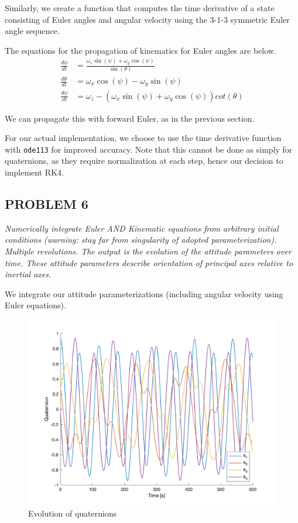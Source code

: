 Similarly, we create a function that computes the time derivative of a state consisting of Euler angles and angular velocity using the 3-1-3 symmetric Euler angle sequence.

The equations for the propagation of kinematics for Euler angles are below.
\begin{align*}
\frac{d \phi}{dt} &= \frac{\omega_{x} \sin(\psi) + \omega_{y} \cos(\psi)}{\sin(\theta)}\\
\frac{d \theta}{dt} &= \omega_{x} \cos(\psi) - \omega_{y} \sin(\psi)\\
\frac{d \psi}{dt} &= \omega_{z} - (\omega_{x} \sin(\psi) + \omega_{y} \cos(\psi)) cot(\theta)
\end{align*}



We can propagate this with forward Euler, as in the previous section.



For our actual implementation, we choose to use the time derivative function with \texttt{ode113} for improved accuracy. Note that this cannot be done as simply for quaternions, as they require normalization at each step, hence our decision to implement RK4.


\subsection{PROBLEM 6}
\textit{Numerically integrate Euler AND Kinematic equations from arbitrary initial conditions (warning: stay far from singularity of adopted parameterization). Multiple revolutions. The output is the evolution of the attitude parameters over time. These attitude parameters describe orientation of principal axes relative to inertial axes.}

We integrate our attitude parameterizations (including angular velocity using Euler equations).

\begin{figure}[H]
\centering
\includegraphics[scale=0.6]{Images/ps3_problem6_quaternions.png}
\caption{Evolution of quaternions}
\label{fig:ps3_problem6_quaternions}
\end{figure}

